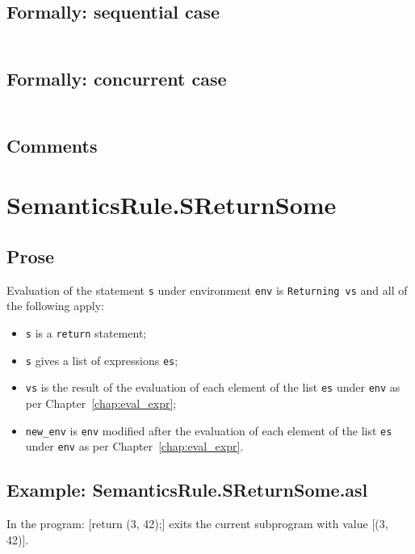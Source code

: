 \documentclass{book}
\begin{document}
  \subsection{Formally: sequential case}
  \begin{align}
  \end{align} 

  \subsection{Formally: concurrent case}
  \begin{align}
  \end{align} 

    \subsection{Comments}

\section{SemanticsRule.SReturnSome \label{sec:SemanticsRule.SReturnSome}}

    \subsection{Prose}
Evaluation of the statement \texttt{s} under environment \texttt{env} is
\texttt{Returning vs} and all of the following apply:
    \begin{itemize}
    \item \texttt{s} is a \texttt{return} statement;
    \item \texttt{s} gives a list of expressions \texttt{es};
    \item \texttt{vs} is the result of the evaluation of each element of the list \texttt{es} under \texttt{env} as per Chapter~\ref{chap:eval_expr};
    \item \texttt{new\_env} is \texttt{env} modified after the evaluation of each element of the list \texttt{es} under \texttt{env} as per Chapter~\ref{chap:eval_expr}.
    \end{itemize}

    \subsection{Example: SemanticsRule.SReturnSome.asl}
    In the program:
    [return (3, 42);] exits the current subprogram with value [(3, 42)].
\end{document}
